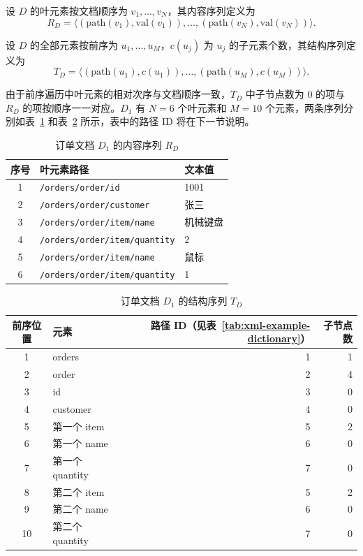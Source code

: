 \begin{definition}[内容序列]
\label{def:rep-content}
设 $D$ 的叶元素按文档顺序为 $v_1,\ldots,v_N$，其内容序列定义为
\[
R_D=\langle(\mathrm{path}(v_1),\mathrm{val}(v_1)),\ldots,(\mathrm{path}(v_N),\mathrm{val}(v_N))\rangle.
\]
\end{definition}

\begin{definition}[结构序列]
\label{def:rep-structure}
设 $D$ 的全部元素按前序为 $u_1,\ldots,u_M$，$c(u_j)$ 为 $u_j$ 的子元素个数，其结构序列定义为
\[
T_D=\langle(\mathrm{path}(u_1),c(u_1)),\ldots,(\mathrm{path}(u_M),c(u_M))\rangle.
\]
\end{definition}

由于前序遍历中叶元素的相对次序与文档顺序一致，$T_D$ 中子节点数为 0 的项与 $R_D$ 的项按顺序一一对应。$D_1$ 有 $N=6$ 个叶元素和 $M=10$ 个元素，两条序列分别如表~\ref{tab:encoding-content} 和表~\ref{tab:preorder-node-records} 所示，表中的路径 ID 将在下一节说明。

\begin{table}[htbp]
\centering\small
\caption{订单文档 $D_1$ 的内容序列 $R_D$}
\label{tab:encoding-content}
\begin{tabular}{cll}
\toprule
序号 & 叶元素路径 & 文本值 \\
\midrule
1 & \texttt{/orders/order/id} & 1001 \\
2 & \texttt{/orders/order/customer} & 张三 \\
3 & \texttt{/orders/order/item/name} & 机械键盘 \\
4 & \texttt{/orders/order/item/quantity} & 2 \\
5 & \texttt{/orders/order/item/name} & 鼠标 \\
6 & \texttt{/orders/order/item/quantity} & 1 \\
\bottomrule
\end{tabular}
\end{table}

\begin{table}[htbp]
\centering\small
\caption{订单文档 $D_1$ 的结构序列 $T_D$}
\label{tab:preorder-node-records}
\begin{tabular}{clrr}
\toprule
前序位置 & 元素 & 路径 ID（见表~\ref{tab:xml-example-dictionary}） & 子节点数 \\
\midrule
1 & orders & 1 & 1 \\
2 & order & 2 & 4 \\
3 & id & 3 & 0 \\
4 & customer & 4 & 0 \\
5 & 第一个 item & 5 & 2 \\
6 & 第一个 name & 6 & 0 \\
7 & 第一个 quantity & 7 & 0 \\
8 & 第二个 item & 5 & 2 \\
9 & 第二个 name & 6 & 0 \\
10 & 第二个 quantity & 7 & 0 \\
\bottomrule
\end{tabular}
\end{table}

